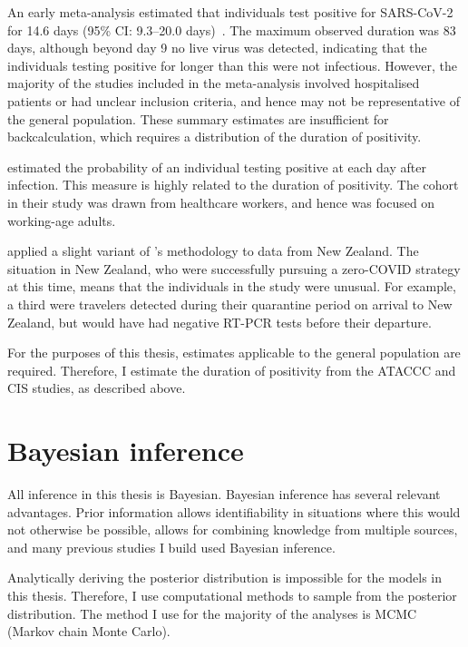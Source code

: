 \documentclass[thesis.tex]{subfiles}
\begin{document}
An early meta-analysis estimated that individuals test positive for SARS-CoV-2 for 14.6 days (95\% CI: 9.3--20.0 days)~\autocite{cevikShedding}.
The maximum observed duration was 83 days, although beyond day 9 no live virus was detected, indicating that the individuals testing positive for longer than this were not infectious.
However, the majority of the studies included in the meta-analysis involved hospitalised patients or had unclear inclusion criteria, and hence may not be representative of the general population.
These summary estimates are insufficient for backcalculation, which requires a distribution of the duration of positivity.

\Textcite{hellewellPCRSensitivity} estimated the probability of an individual testing positive at each day after infection.
This measure is highly related to the duration of positivity.
The cohort in their study was drawn from healthcare workers, and hence was focused on working-age adults.

\Textcite{binnySensitivity} applied a slight variant of \textcite{hellewellPCRSensitivity}'s methodology to data from New Zealand.
The situation in New Zealand, who were successfully pursuing a zero-COVID strategy at this time, means that the individuals in the study were unusual.
For example, a third were travelers detected during their quarantine period on arrival to New Zealand, but would have had negative RT-PCR tests before their departure.

For the purposes of this thesis, estimates applicable to the general population are required.
Therefore, I estimate the duration of positivity from the ATACCC and CIS studies, as described above.



\section{Bayesian inference} \label{intro:sec:Bayes}

All inference in this thesis is Bayesian.
Bayesian inference has several relevant advantages.
Prior information allows identifiability in situations where this would not otherwise be possible, allows for combining knowledge from multiple sources, and many previous studies I build used Bayesian inference.

Analytically deriving the posterior distribution is impossible for the models in this thesis.
Therefore, I use computational methods to sample from the posterior distribution.
The method I use for the majority of the analyses is MCMC (Markov chain Monte Carlo).
\end{document}
